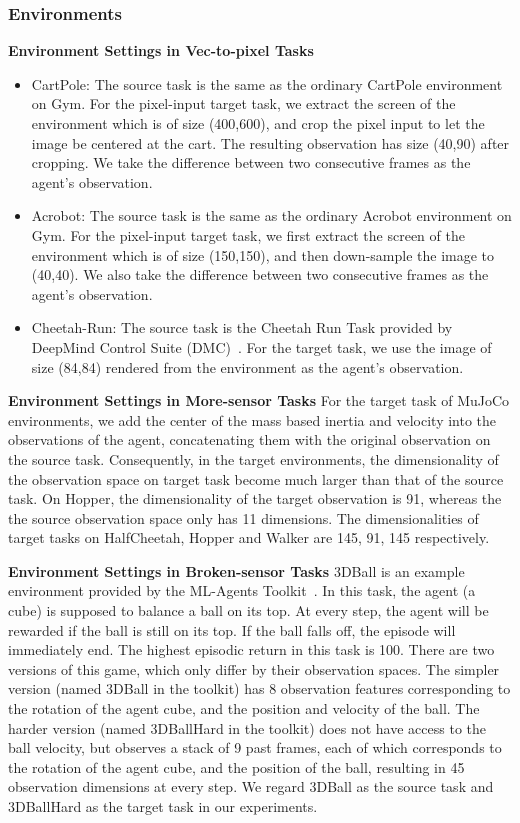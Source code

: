 \subsubsection{Environments}
\label{app:exp_env}

\textbf{Environment Settings in Vec-to-pixel Tasks}\quad
\begin{itemize}
    \item CartPole: The source task is the same as the ordinary CartPole environment on Gym. For the pixel-input target task, we extract the screen of the environment which is of size (400,600), and crop the pixel input to let the image be centered at the cart. The resulting observation has size (40,90) after cropping. We take the difference between two consecutive frames as the agent's observation.
    \item Acrobot: The source task is the same as the ordinary Acrobot environment on Gym. For the pixel-input target task, we first extract the screen of the environment which is of size (150,150), and then down-sample the image to (40,40). We also take the difference between two consecutive frames as the agent's observation.\newline
    \item Cheetah-Run: The source task is the Cheetah Run Task provided by DeepMind Control Suite (DMC)~\citep{tassa2018deepmind}. For the target task, we use the image of size (84,84) rendered from the environment as the agent's observation.
\end{itemize}
\textbf{Environment Settings in More-sensor Tasks}\quad
For the target task of MuJoCo environments, we add the center of the mass based inertia and velocity into the observations of the agent, concatenating them with the original observation on the source task. Consequently, in the target environments, the dimensionality of the observation space on target task become much larger than that of the source task. On Hopper, the dimensionality of the target observation is 91, whereas the the source observation space only has 11 dimensions. The dimensionalities of target tasks on HalfCheetah, Hopper and Walker are 145, 91, 145 respectively.

\textbf{Environment Settings in Broken-sensor Tasks}\quad
3DBall is an example environment provided by the ML-Agents Toolkit~\citep{juliani2018unity}. In this task, the agent (a cube) is supposed to balance a ball on its top. At every step, the agent will be rewarded if the ball is still on its top. If the ball falls off, the episode will immediately end.
The highest episodic return in this task is 100. 
There are two versions of this game, which only differ by their observation spaces.
The simpler version (named 3DBall in the toolkit) has 8 observation features corresponding to the rotation of the agent cube, and the position and velocity of the ball.
The harder version (named 3DBallHard in the toolkit) does not have access to the ball velocity, but observes a stack of 9 past frames, each of which corresponds to the rotation of the agent cube, and the position of the ball, resulting in 45 observation dimensions at every step.
We regard 3DBall as the source task and 3DBallHard as the target task in our experiments.

